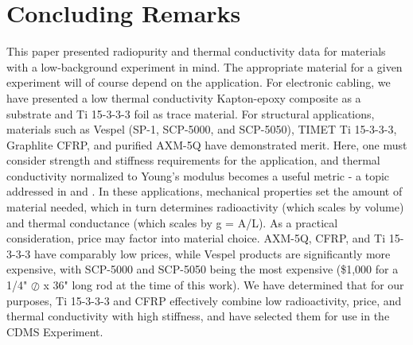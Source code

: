 \documentclass[final]{svjour2}
\begin{document}
\section{Concluding Remarks}
This paper presented radiopurity and thermal conductivity data for materials with a low-background experiment in mind. The appropriate material for a given experiment will of course depend on the application. For electronic cabling, we have presented a low thermal conductivity Kapton-epoxy composite as a substrate and Ti 15-3-3-3 foil as trace material. For structural applications, materials such as Vespel (SP-1, SCP-5000, and SCP-5050), TIMET Ti 15-3-3-3, Graphlite CFRP, and purified AXM-5Q have demonstrated merit. Here, one must consider strength and stiffness requirements for the application, and thermal conductivity normalized to Young's modulus becomes a useful metric - a topic addressed in \cite{Runyan2008} and \cite{Kramer2013}. In these applications, mechanical properties set the amount of material needed, which in turn determines radioactivity (which scales by volume) and thermal conductance (which scales by g = A/L). As a practical consideration, price may factor into material choice. AXM-5Q, CFRP, and Ti 15-3-3-3 have comparably low prices, while Vespel products are significantly more expensive, with SCP-5000 and SCP-5050 being the most expensive (\$1,000 for a 1/4" $\oslash$ x 36" long rod at the time of this work). We have determined that for our purposes, Ti 15-3-3-3 and CFRP effectively combine low radioactivity, price, and thermal conductivity with high stiffness, and have selected them for use in the CDMS Experiment.
\end{document}
